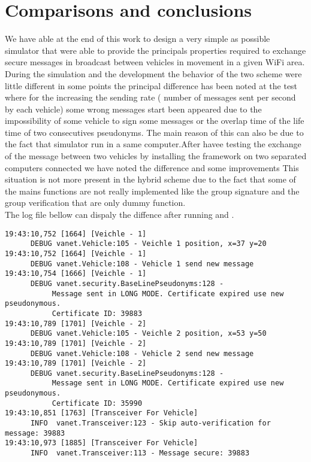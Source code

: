 \section{Comparisons and conclusions}
We have able at the end of this work to design a very simple as possible simulator that were able to provide the principals properties required to exchange secure messages in broadcast between vehicles in movement in a given WiFi area.    
During the simulation and the development the behavior of the two scheme were little different in some points the principal difference has been noted at the test where for the \baseline increasing the sending rate ( number of messages sent per  second by each vehicle) some wrong messages start been appeared due to the impossibility of some vehicle to sign some messages or the overlap time of the life time of two consecutives pseudonyms. The main reason of this can also be due to the fact that simulator run in a same computer.After havee testing the exchange of the message between two vehicles by installing the framework on two separated computers connected we have noted the difference and some improvements
This situation is not more present in the hybrid scheme due to the fact that some of the mains functions are not really implemented like the group signature and the group verification that are only dummy function.\\

The log file bellow can dispaly the diffence after running \baseline and \hybrid.
\baseline
\begin{verbatim}
19:43:10,752 [1664] [Veichle - 1] 
      DEBUG vanet.Vehicle:105 - Veichle 1 position, x=37 y=20
19:43:10,752 [1664] [Veichle - 1] 
      DEBUG vanet.Vehicle:108 - Vehicle 1 send new message
19:43:10,754 [1666] [Veichle - 1] 
      DEBUG vanet.security.BaseLinePseudonyms:128 - 
           Message sent in LONG MODE. Certificate expired use new pseudonymous. 
           Certificate ID: 39883
19:43:10,789 [1701] [Veichle - 2] 
      DEBUG vanet.Vehicle:105 - Veichle 2 position, x=53 y=50
19:43:10,789 [1701] [Veichle - 2] 
      DEBUG vanet.Vehicle:108 - Vehicle 2 send new message
19:43:10,789 [1701] [Veichle - 2] 
      DEBUG vanet.security.BaseLinePseudonyms:128 - 
           Message sent in LONG MODE. Certificate expired use new pseudonymous. 
           Certificate ID: 35990
19:43:10,851 [1763] [Transceiver For Vehicle] 
      INFO  vanet.Transceiver:123 - Skip auto-verification for message: 39883
19:43:10,973 [1885] [Transceiver For Vehicle] 
      INFO  vanet.Transceiver:113 - Message secure: 39883
\end{verbatim}

